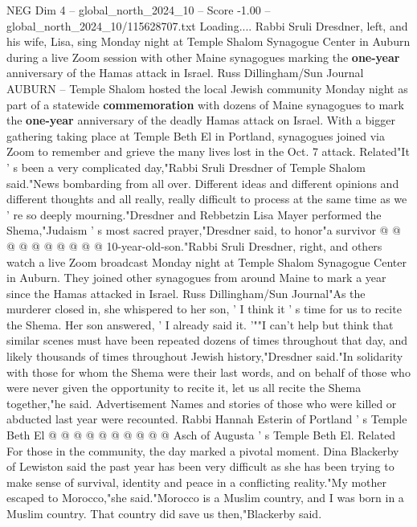 \begin{textsample}{NEG Dim 4 – global\_north\_2024\_10 – Score -1.00 – global\_north\_2024\_10/115628707.txt}  \label{ex:f4_neg_060}
Loading....
Rabbi Sruli Dresdner, left, and his wife, Lisa, sing Monday night at Temple Shalom Synagogue Center in Auburn during a live Zoom session with other Maine synagogues marking the \textbf{one-year} anniversary of the Hamas attack in Israel.
Russ Dillingham/Sun Journal AUBURN -- Temple Shalom hosted the local Jewish community Monday night as part of a statewide \textbf{commemoration} with dozens of Maine synagogues to mark the \textbf{one-year} anniversary of the deadly Hamas attack on Israel.
With a bigger gathering taking place at Temple Beth El in Portland, synagogues joined via Zoom to remember and grieve the many lives lost in the Oct. 7 attack.
Related"It ' s been a very complicated day,"Rabbi Sruli Dresdner of Temple Shalom said."News bombarding from all over.
Different ideas and different opinions and different thoughts and all really, really difficult to process at the same time as we ' re so deeply mourning."Dresdner and Rebbetzin Lisa Mayer performed the Shema,"Judaism ' s most sacred prayer,"Dresdner said, to honor"a survivor @ @ @ @ @ @ @ @ @ @ 10-year-old-son."Rabbi Sruli Dresdner, right, and others watch a live Zoom broadcast Monday night at Temple Shalom Synagogue Center in Auburn.
They joined other synagogues from around Maine to mark a year since the Hamas attacked in Israel.
Russ Dillingham/Sun Journal"As the murderer closed in, she whispered to her son, ' I think it ' s time for us to recite the Shema.
Her son answered, ' I already said it. '""I can't help but think that similar scenes must have been repeated dozens of times throughout that day, and likely thousands of times throughout Jewish history,"Dresdner said."In solidarity with those for whom the Shema were their last words, and on behalf of those who were never given the opportunity to recite it, let us all recite the Shema together,"he said.
Advertisement Names and stories of those who were killed or abducted last year were recounted.
Rabbi Hannah Esterin of Portland ' s Temple Beth El @ @ @ @ @ @ @ @ @ @ Asch of Augusta ' s Temple Beth El.
Related For those in the community, the day marked a pivotal moment.
Dina Blackerby of Lewiston said the past year has been very difficult as she has been trying to make sense of survival, identity and peace in a conflicting reality."My mother escaped to Morocco,"she said."Morocco is a Muslim country, and I was born in a Muslim country.
That country did save us then,"Blackerby said.

\end{textsample}
